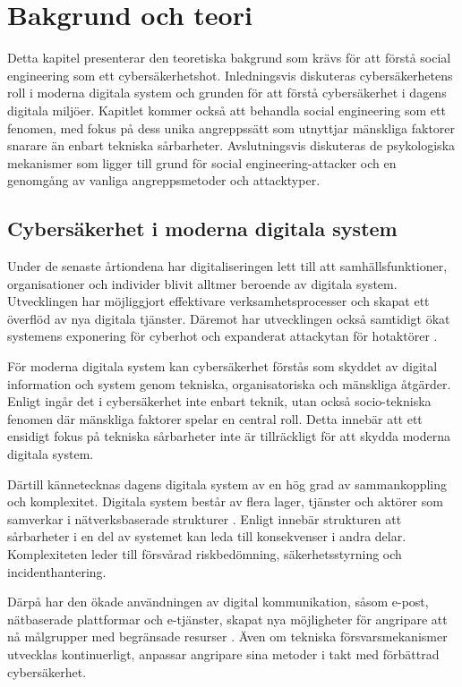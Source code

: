 \chapter{Bakgrund och teori}
Detta kapitel presenterar den teoretiska bakgrund som krävs för att förstå social engineering som ett cybersäkerhetshot. Inledningsvis diskuteras cybersäkerhetens 
roll i moderna digitala system och grunden för att förstå cybersäkerhet i dagens digitala miljöer. Kapitlet kommer också att behandla social engineering som ett fenomen, 
med fokus på dess unika angreppssätt som utnyttjar mänskliga faktorer snarare än enbart tekniska sårbarheter. Avslutningsvis diskuteras de psykologiska mekanismer som ligger 
till grund för social engineering-attacker och en genomgång av vanliga angreppsmetoder och attacktyper.

\section{Cybersäkerhet i moderna digitala system}
Under de senaste årtiondena har digitaliseringen lett till att samhällsfunktioner, organisationer och individer blivit alltmer beroende av digitala system. 
Utvecklingen har möjliggjort effektivare verksamhetsprocesser och skapat ett överflöd av nya digitala tjänster. Däremot har utvecklingen också samtidigt ökat 
systemens exponering för cyberhot och expanderat attackytan för hotaktörer \cite{gururaj2024social_engineering}.

För moderna digitala system kan cybersäkerhet förstås som skyddet av digital information och system genom tekniska, organisatoriska och mänskliga åtgärder. 
Enligt \cite{washo2021interdisciplinary, enisa2018cybersecurity_culture} ingår det i cybersäkerhet inte enbart teknik, utan också socio-tekniska fenomen där mänskliga 
faktorer spelar en central roll. Detta innebär att ett ensidigt fokus på tekniska sårbarheter inte är tillräckligt för att skydda moderna digitala system.

Därtill kännetecknas dagens digitala system av en hög grad av sammankoppling och komplexitet. Digitala system består av flera lager, tjänster och aktörer som samverkar 
i nätverksbaserade strukturer \cite{springer_social_engineering_ontology}. Enligt \cite{springer_social_engineering_ontology} innebär strukturen att sårbarheter i en del 
av systemet kan leda till konsekvenser i andra delar. Komplexiteten leder till försvårad riskbedömning, säkerhetsstyrning och incidenthantering. 

Därpå har den ökade användningen av digital kommunikation, såsom e-post, nätbaserade plattformar och e-tjänster, skapat nya möjligheter för angripare att nå målgrupper 
med begränsade resurser \cite{basnet2023anti_phishing}. Även om tekniska försvarsmekanismer utvecklas kontinuerligt, anpassar angripare sina metoder i takt med förbättrad cybersäkerhet. 

